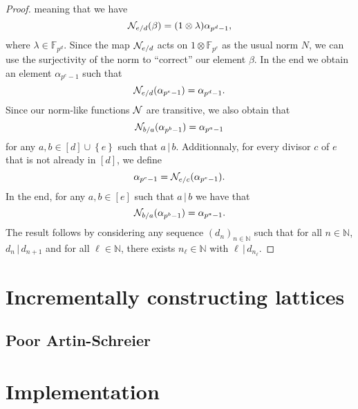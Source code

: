 \documentclass{sig-alternate}
\begin{document}
\begin{proof}
meaning that we have
\[
  \mathcal{N}_{e/d}(\beta)=(1\otimes\lambda)\alpha_{p^{d}-1},
\]
where $\lambda\in\mathbb{F}_{p^d}$. Since the map
$\mathcal{N}_{e/d}$ acts on $1\otimes\mathbb{F}_{p^{e}}$ as the
usual norm $N$, we can use
the surjectivity of the norm to ``correct'' our element $\beta$. In the end we
obtain an element $\alpha_{p^{e}-1}$ such
that
\[
  \mathcal{N}_{e/d}(\alpha_{p^{e}-1}) = \alpha_{p^{d}-1}.
\]
Since our norm-like functions $\mathcal{N}$ are transitive, we also obtain that
\[
  \mathcal{N}_{b/a}(\alpha_{p^b-1})=\alpha_{p^a-1}
\]
for any $a,b\in \left[ d \right]\cup\left\{ e \right\}$ such that
$a\,|\,b$. Additionnaly, for every divisor $c$ of $e$ that is not already in $\left[
d \right]$, we define
\[
  \alpha_{p^c-1}=\mathcal{N}_{e/c}(\alpha_{p^{e}-1}).
\]
In the end, for any $a, b\in\left[ e \right]$ such that
$a\,|\,b$ we have that
\[
  \mathcal{N}_{b/a}(\alpha_{p^b-1})=\alpha_{p^a-1}.
\]
The result follows by considering any sequence $(d_n)_{n\in\mathbb{N}}$ such
that for all $n\in\mathbb{N}$, $d_n\,|\,d_{n+1}$ and for all
$\ell\in\mathbb{N}$, there exists $n_\ell\in\mathbb{N}$ with
$\ell\,|\,d_{n_\ell}$.
\end{proof}


\section{Incrementally constructing lattices}
\label{sec:construction}

\subsection{Poor Artin-Schreier}


\section{Implementation}
\label{sec:implementation}



\end{document}
